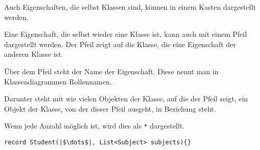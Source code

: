 \documentclass[a4paper]{scrartcl}
\begin{document}
Auch Eigenschaften, die selbst Klassen sind, können in einem Kasten dargestellt werden.
\begin{center}
\end{center}


\noindent
Eine Eigenschaft, die selbst wieder eine Klasse ist, kann auch mit einem Pfeil dargestellt werden. Der Pfeil zeigt auf die Klasse, die eine Eigenschaft der anderen Klasse ist.
\begin{center}
\end{center}
Über dem Pfeil steht der Name der Eigenschaft. Diese nennt man in Klassendiagrammen Rollennamen.

Darunter steht mit wie vielen Objekten der Klasse, auf die der Pfeil zeigt, ein Objekt der Klasse, von der dieser Pfeil ausgeht, in Beziehung steht.


Wenn jede Anzahl möglich ist, wird dies als \texttt{*} dargestellt.
\begin{verbatim}
record Student(|$\dots$|, List<Subject> subjects){}
\end{verbatim}


\begin{center}
\end{center}
\end{document}
